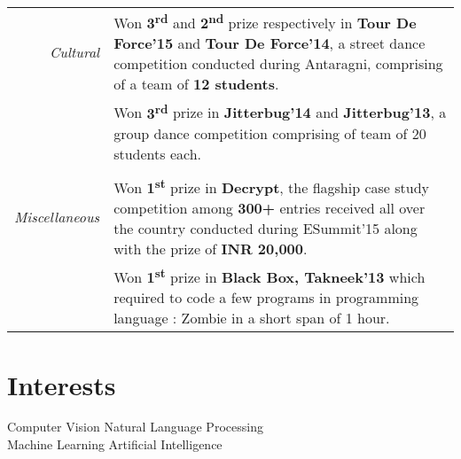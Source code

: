 \documentclass[a4paper]{norm-resume}
\begin{document}
\noindent\begin{tabular}{r|p{16cm}}	
	
\null \hspace{10mm} \normalsize\emph{Cultural} & \small{Won \textbf{3\textsuperscript{rd}} and \textbf{2\textsuperscript{nd}} prize respectively in \textbf{Tour De Force’15} and \textbf{Tour De Force’14}, a street dance competition conducted during Antaragni, comprising of a team of \textbf{12 students}.}\\
& \small{ Won \textbf{3\textsuperscript{rd}} prize in \textbf{Jitterbug’14} and \textbf{Jitterbug’13}, a group dance competition comprising of team of 20 students each.} \\

\multicolumn{2}{c}{} \\
\normalsize\emph{Miscellaneous} & \small{Won \textbf{1\textsuperscript{st}} prize in \textbf{Decrypt}, the flagship case study competition among \textbf{300+} entries received all over the country conducted during ESummit'15 along with the prize of \textbf{INR 20,000}.}\\
& \small{ Won \textbf{1\textsuperscript{st}} prize in \textbf{Black Box, Takneek’13} which required to code a few programs in programming language : Zombie in a short span of 1 hour.} \\
\end{tabular}



	

\vspace{1mm}
\section{Interests}

\vspace{1mm} %

	{\large{
	{Computer Vision \hfill Natural Language Processing \\
	Machine Learning \hfill Artificial Intelligence}		
	}}
	
\end{document}
